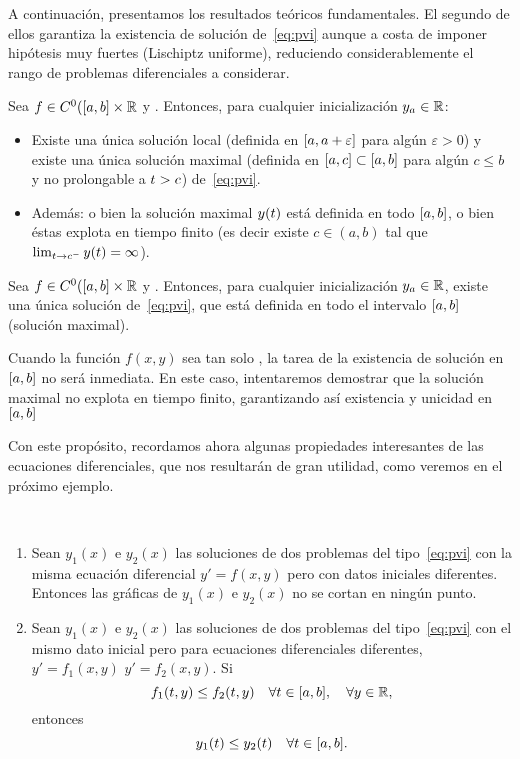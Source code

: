 A continuación, presentamos los resultados teóricos fundamentales. El
segundo de ellos garantiza la existencia de solución de~\eqref{eq:pvi}
aunque a costa de imponer hipótesis muy fuertes (Lischiptz uniforme),
reduciendo considerablemente el rango de problemas diferenciales a
considerar.

\begin{theorem}
  \label{thm:existencia-loc-lischiptz}
  Sea $f\in C^0([\ta,\tb]\times\Rset$ y \locLischiptz. Entonces, para
  cualquier inicialización $\ycero\in\Rset$:
  \begin{itemize}
  \item Existe una única solución local (definida en
    $[\ta,\ta+\varepsilon]$ para algún $\varepsilon>0$) y existe una
    única solución maximal (definida en $[\ta,c]\subset[\ta,\tb]$ para
    algún $c\le b$ y no prolongable a $\tt>c$) de~\eqref{eq:pvi}.
  \item Además: o bien la solución maximal $y(\tt)$  está definida en todo
    $[\ta,\tb]$, o bien éstas explota en tiempo finito (es decir existe
    $c\in (a,b)$ tal que $\lim_{\tt\to c^-} \sol(\tt) = \infty$).
  \end{itemize}
\end{theorem}

\begin{theorem}
  \label{thm:existencia-unif-lischiptz}
  Sea $f\in C^0([\ta,\tb]\times\Rset$ y \locLischiptz.  Entonces, para
  cualquier inicialización $\ycero\in\Rset$, existe una única solución
  de~\eqref{eq:pvi}, que está definida en todo el intervalo
  $[\ta,\tb]$ (solución maximal).
\end{theorem}

Cuando la función $f(x,y)$ sea tan solo \locLischiptz, la tarea de la
existencia de solución en $[\ta,\tb]$ no será inmediata. En este
caso, intentaremos demostrar que la solución maximal no explota en
tiempo finito, garantizando así existencia y unicidad en $[\ta,\tb]$

Con este propósito, recordamos ahora algunas propiedades interesantes
de las ecuaciones diferenciales, que nos resultarán de gran utilidad,
como veremos en el próximo ejemplo.

\begin{proposition}
  ~
  \begin{enumerate}
  \item Sean $y_1(x)$ e $y_2(x)$ las soluciones de dos problemas del
    tipo~\eqref{eq:pvi} con la misma ecuación diferencial $y'=f(x,y)$
    pero con datos iniciales diferentes. Entonces las gráficas de
    $y_1(x)$ e $y_2(x)$ no se cortan en ningún punto.
  \item Sean $y_1(x)$ e $y_2(x)$ las soluciones de dos problemas del
    tipo~\eqref{eq:pvi} con el mismo dato inicial pero para ecuaciones
    diferenciales diferentes, $y'=f_1(x,y)$ $y'=f_2(x,y)$. Si
    $$
    f_1(\tt,y) \le f_2(\tt,y) \quad \forall \tt\in[\ta,\tb], \quad
    \forall y\in\Rset,
    $$
    entonces
    $$
    y_1(\tt)\le y_2(\tt) \quad \forall \tt\in[\ta,\tb].
    $$
  \end{enumerate}
\end{proposition}

